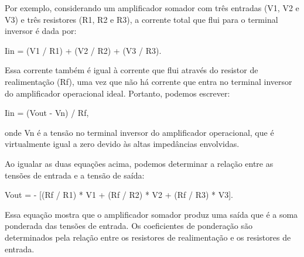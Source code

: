 \documentclass[12pt,twoside, a4paper, twocolumn]{article}
\begin{document}
Por exemplo, considerando um amplificador somador com três entradas (V1, V2 e V3) e três resistores (R1, R2 e R3), a corrente total que flui para o terminal inversor é dada por:

Iin = (V1 / R1) + (V2 / R2) + (V3 / R3).

Essa corrente também é igual à corrente que flui através do resistor de realimentação (Rf), uma vez que não há corrente que entra no terminal inversor do amplificador operacional ideal. Portanto, podemos escrever:

Iin = (Vout - Vn) / Rf,

onde Vn é a tensão no terminal inversor do amplificador operacional, que é virtualmente igual a zero devido às altas impedâncias envolvidas.

Ao igualar as duas equações acima, podemos determinar a relação entre as tensões de entrada e a tensão de saída:

Vout = - [(Rf / R1) * V1 + (Rf / R2) * V2 + (Rf / R3) * V3].

Essa equação mostra que o amplificador somador produz uma saída que é a soma ponderada das tensões de entrada. Os coeficientes de ponderação são determinados pela relação entre os resistores de realimentação e os resistores de entrada.

\end{document}
